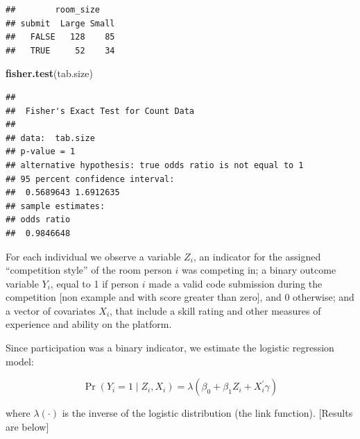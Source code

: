 \documentclass[]{article}
\newenvironment{Shaded}{\begin{snugshade}}{\end{snugshade}}
\newcommand{\KeywordTok}[1]{\textcolor[rgb]{0.13,0.29,0.53}{\textbf{#1}}}
\newcommand{\NormalTok}[1]{#1}
\let\oldShaded\Shaded
\let\endoldShaded\endShaded
\renewenvironment{Shaded}{\footnotesize\oldShaded}{\endoldShaded}
\begin{document}
\begin{verbatim}
##        room_size
## submit  Large Small
##   FALSE   128    85
##   TRUE     52    34
\end{verbatim}

\begin{Shaded}
\begin{Highlighting}[]
\KeywordTok{fisher.test}\NormalTok{(tab.size)}
\end{Highlighting}
\end{Shaded}

\begin{verbatim}
## 
##  Fisher's Exact Test for Count Data
## 
## data:  tab.size
## p-value = 1
## alternative hypothesis: true odds ratio is not equal to 1
## 95 percent confidence interval:
##  0.5689643 1.6912635
## sample estimates:
## odds ratio 
##  0.9846648
\end{verbatim}

For each individual we observe a variable \(Z_i\), an indicator for the
assigned ``competition style'' of the room person \(i\) was competing
in; a binary outcome variable \(Y_i\), equal to 1 if person \(i\) made a
valid code submission during the competition {[}non example and with
score greater than zero{]}, and 0 otherwise; and a vector of covariates
\(X_i\), that include a skill rating and other measures of experience
and ability on the platform.

Since participation was a binary indicator, we estimate the logistic
regression model:

\[
    \Pr( Y_i = 1 \mid Z_i, X_i) = \lambda(\beta_0 + \beta_1 Z_i + X_i^\prime \gamma)
\]

where \(\lambda(\cdot)\) is the inverse of the logistic distribution
(the link function). {[}Results are below{]}
\end{document}
